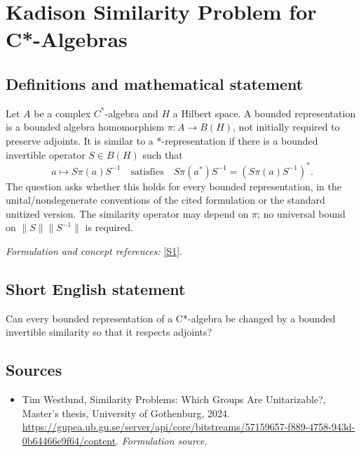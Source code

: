 \documentclass[11pt]{article}
\begin{document}
\section*{\texorpdfstring{Kadison Similarity Problem for C*-Algebras}{Kadison Similarity Problem for C*-Algebras}}\label{252}
\subsection{Definitions and mathematical statement}
Let $A$ be a complex $C^*$-algebra and $H$ a Hilbert space. A bounded representation is a bounded algebra homomorphism $\pi:A\to B(H)$, not initially required to preserve adjoints. It is similar to a $*$-representation if there is a bounded invertible operator $S\in B(H)$ such that
\[
 a\longmapsto S\pi(a)S^{-1}
 \quad\text{satisfies}\quad
 S\pi(a^*)S^{-1}=(S\pi(a)S^{-1})^*.
\]
The question asks whether this holds for every bounded representation, in the unital/nondegenerate conventions of the cited formulation or the standard unitized version. The similarity operator may depend on $\pi$; no universal bound on $\|S\|\|S^{-1}\|$ is required.
\par\smallskip\textit{Formulation and concept references:} \href{https://gupea.ub.gu.se/server/api/core/bitstreams/57159657-f889-4758-943d-0b64466e9f64/content}{[S1]}.

\subsection{Short English statement}
Can every bounded representation of a C*-algebra be changed by a bounded invertible similarity so that it respects adjoints?
\subsection{Sources}
\begin{itemize}
\item[S1]Tim Westlund, Similarity Problems: Which Groups Are Unitarizable?, Master's thesis, University of Gothenburg, 2024.
\url{https://gupea.ub.gu.se/server/api/core/bitstreams/57159657-f889-4758-943d-0b64466e9f64/content}.
\textit{Formulation source.}
\end{itemize}
\end{document}
